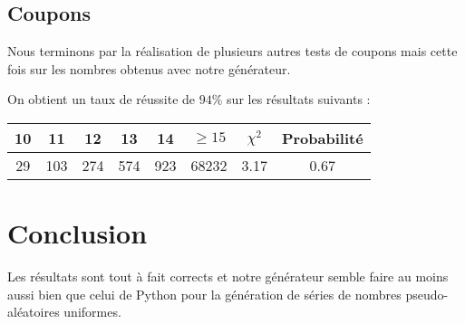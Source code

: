 \documentclass[12pt,a4paper]{article}
\begin{document}
\subsection{Coupons}

Nous terminons par la réalisation de plusieurs autres tests de coupons mais
cette fois sur les nombres obtenus avec notre générateur.

On obtient un taux de réussite de $94\%$ sur les résultats suivants :

\begin{center}
\begin{tabular}{c|c|c|c|c|c|c|c}
10 & 11 & 12 & 13 & 14 & $\geq 15$ & $\chi^2$ & Probabilité \\ \hline
29 & 103 & 274 & 574 & 923 & 68232 &  3.17 &  0.67
\end{tabular}
\end{center}


\section{Conclusion}
Les résultats sont tout à fait corrects et notre générateur semble faire
au moins aussi bien que celui de Python pour la génération de séries de nombres
pseudo-aléatoires uniformes.
\end{document}
